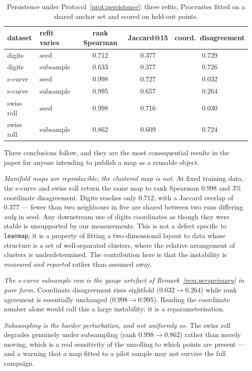 \documentclass[12pt]{iopart}
\theoremstyle{definition}
\theoremstyle{plain}
\theoremstyle{remark}
\newcommand{\code}[1]{\texttt{#1}}
\begin{document}
\begin{table}[htbp]
\centering
\small
\caption{Persistence under Protocol~\ref{prot:persistence}: three refits,
Procrustes fitted on a shared anchor set and scored on held-out points.}
\label{tab:persistence}
\begin{tabular}{llccc}
\toprule
dataset & refit varies & rank Spearman & Jaccard@15 & coord.\ disagreement \\
\midrule
digits     & seed      & 0.712 & 0.377 & 0.729 \\
digits     & subsample & 0.633 & 0.377 & 0.726 \\
s-curve    & seed      & 0.998 & 0.727 & 0.032 \\
s-curve    & subsample & 0.995 & 0.657 & 0.264 \\
swiss roll & seed      & 0.998 & 0.716 & 0.030 \\
swiss roll & subsample & 0.862 & 0.609 & 0.724 \\
\bottomrule
\end{tabular}
\end{table}

Three conclusions follow, and they are the most consequential results in the
paper for anyone intending to publish a map as a reusable object.

\emph{Manifold maps are reproducible; the clustered map is not.} At fixed
training data, the s-curve and swiss roll return the same map to rank Spearman
$0.998$ and $3\%$ coordinate disagreement. Digits reaches only $0.712$, with a
Jaccard overlap of $0.377$ --- fewer than two neighbours in five are shared
between two runs differing \emph{only} in seed. Any downstream use of digits
coordinates as though they were stable is unsupported by our measurements. This
is not a defect specific to \code{leanmap}; it is a property of fitting a
two-dimensional layout to data whose structure is a set of well-separated
clusters, where the relative arrangement of clusters is underdetermined. The
contribution here is that the instability is \emph{measured and reported}
rather than assumed away.

\emph{The s-curve subsample row is the gauge artefact of
Remark~\ref{rem:persprimary} in pure form.} Coordinate disagreement rises
eightfold ($0.032\to0.264$) while rank agreement is essentially unchanged
($0.998\to0.995$). Reading the coordinate number alone would call this a large
instability; it is a reparameterisation.

\emph{Subsampling is the harder perturbation, and not uniformly so.} The swiss
roll degrades genuinely under subsampling (rank $0.998\to0.862$) rather than
merely moving, which is a real sensitivity of the unrolling to which points are
present --- and a warning that a map fitted to a pilot sample may not survive
the full campaign.
\end{document}
